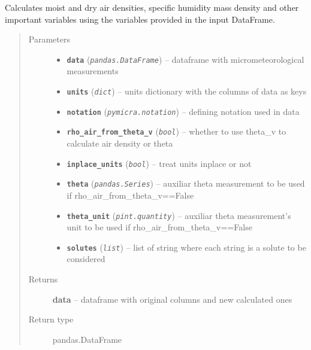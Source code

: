 \documentclass[a4paper,10pt,oneside]{sphinxmanual}
\begin{document}

\begin{fulllineitems}
\label{pymicra.micro:pymicra.micro.util.preProcess}
Calculates moist and dry air densities, specific humidity mass density and other
important variables using the variables provided in the input DataFrame.
\begin{quote}\begin{description}
\item[{Parameters}] \leavevmode\begin{itemize}
\item {} 
\textbf{\texttt{data}} (\emph{\texttt{pandas.DataFrame}}) -- dataframe with micrometeorological measurements

\item {} 
\textbf{\texttt{units}} (\emph{\texttt{dict}}) -- units dictionary with the columns of data as keys

\item {} 
\textbf{\texttt{notation}} (\emph{\texttt{pymicra.notation}}) -- defining notation used in data

\item {} 
\textbf{\texttt{rho\_air\_from\_theta\_v}} (\emph{\texttt{bool}}) -- whether to use theta\_v to calculate air density or theta

\item {} 
\textbf{\texttt{inplace\_units}} (\emph{\texttt{bool}}) -- treat units inplace or not

\item {} 
\textbf{\texttt{theta}} (\emph{\texttt{pandas.Series}}) -- auxiliar theta measurement to be used if rho\_air\_from\_theta\_v==False

\item {} 
\textbf{\texttt{theta\_unit}} (\emph{\texttt{pint.quantity}}) -- auxiliar theta measurement's unit to be used if rho\_air\_from\_theta\_v==False

\item {} 
\textbf{\texttt{solutes}} (\emph{\texttt{list}}) -- list of string where each string is a solute to be considered

\end{itemize}

\item[{Returns}] \leavevmode
\textbf{data} -- dataframe with original columns and new calculated ones

\item[{Return type}] \leavevmode
pandas.DataFrame

\end{description}\end{quote}

\end{fulllineitems}
\end{document}
